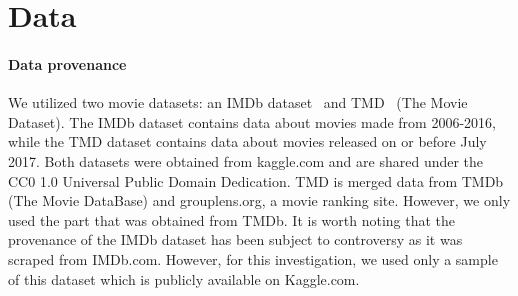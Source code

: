 \section{Data}

    \paragraph{Data provenance}
        We utilized two movie datasets: an IMDb dataset~\cite{data:IMDb} and
            TMD~\cite{data:TMD} (The Movie Dataset).
        The IMDb dataset contains data about movies made from 2006-2016, while the TMD
            dataset contains data about movies released on or before July 2017.
        Both datasets were obtained from kaggle.com and are shared under the CC0 1.0
            Universal Public Domain Dedication.
        TMD is merged data from TMDb (The Movie DataBase) and grouplens.org, a movie
            ranking site.
        However, we only used the part that was obtained from TMDb.
        It is worth noting that the provenance of the IMDb dataset has been subject to
            controversy as it was scraped from IMDb.com.
        However, for this investigation, we used only a sample of this dataset which is
            publicly available on Kaggle.com.

